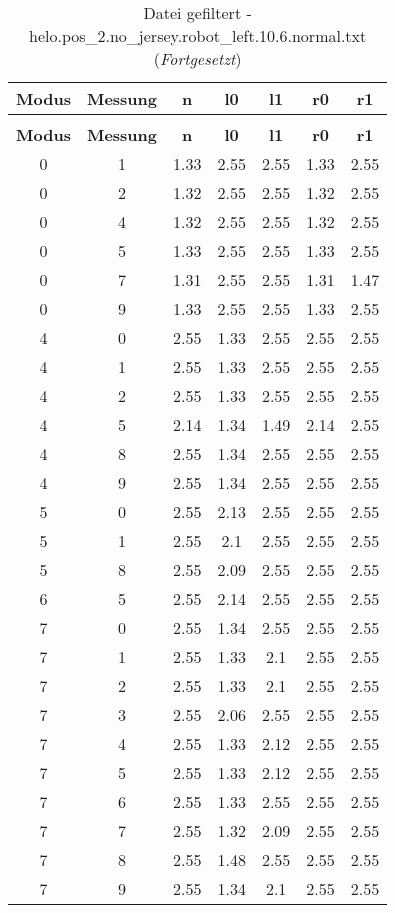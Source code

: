 \begin{longtable}{|c|c||c||c|c||c|c|}
	\caption{Datei gefiltert - helo.pos\_2.no\_jersey.robot\_left.10.6.normal.txt} \label{tab:helo.pos-2.no-jersey.robot-left.10.6.normal.txt} \\ \hline
	\textbf{Modus} & \textbf{Messung} & \textbf{n} & \textbf{l0} & \textbf{l1} & \textbf{r0} & \textbf{r1}\\ \hline
	\endfirsthead
	\caption[]{Datei gefiltert - helo.pos\_2.no\_jersey.robot\_left.10.6.normal.txt (\emph{Fortgesetzt})} \\ \hline
	\textbf{Modus} & \textbf{Messung} & \textbf{n} & \textbf{l0} & \textbf{l1} & \textbf{r0} & \textbf{r1}\\ \hline
	\endhead
	0 & 1 & 1.33 & 2.55 & 2.55 & 1.33 & 2.55 \\ \hline
	0 & 2 & 1.32 & 2.55 & 2.55 & 1.32 & 2.55 \\ \hline
	0 & 4 & 1.32 & 2.55 & 2.55 & 1.32 & 2.55 \\ \hline
	0 & 5 & 1.33 & 2.55 & 2.55 & 1.33 & 2.55 \\ \hline
	0 & 7 & 1.31 & 2.55 & 2.55 & 1.31 & 1.47 \\ \hline
	0 & 9 & 1.33 & 2.55 & 2.55 & 1.33 & 2.55 \\ \hline
	4 & 0 & 2.55 & 1.33 & 2.55 & 2.55 & 2.55 \\ \hline
	4 & 1 & 2.55 & 1.33 & 2.55 & 2.55 & 2.55 \\ \hline
	4 & 2 & 2.55 & 1.33 & 2.55 & 2.55 & 2.55 \\ \hline
	4 & 5 & 2.14 & 1.34 & 1.49 & 2.14 & 2.55 \\ \hline
	4 & 8 & 2.55 & 1.34 & 2.55 & 2.55 & 2.55 \\ \hline
	4 & 9 & 2.55 & 1.34 & 2.55 & 2.55 & 2.55 \\ \hline
	5 & 0 & 2.55 & 2.13 & 2.55 & 2.55 & 2.55 \\ \hline
	5 & 1 & 2.55 & 2.1 & 2.55 & 2.55 & 2.55 \\ \hline
	5 & 8 & 2.55 & 2.09 & 2.55 & 2.55 & 2.55 \\ \hline
	6 & 5 & 2.55 & 2.14 & 2.55 & 2.55 & 2.55 \\ \hline
	7 & 0 & 2.55 & 1.34 & 2.55 & 2.55 & 2.55 \\ \hline
	7 & 1 & 2.55 & 1.33 & 2.1 & 2.55 & 2.55 \\ \hline
	7 & 2 & 2.55 & 1.33 & 2.1 & 2.55 & 2.55 \\ \hline
	7 & 3 & 2.55 & 2.06 & 2.55 & 2.55 & 2.55 \\ \hline
	7 & 4 & 2.55 & 1.33 & 2.12 & 2.55 & 2.55 \\ \hline
	7 & 5 & 2.55 & 1.33 & 2.12 & 2.55 & 2.55 \\ \hline
	7 & 6 & 2.55 & 1.33 & 2.55 & 2.55 & 2.55 \\ \hline
	7 & 7 & 2.55 & 1.32 & 2.09 & 2.55 & 2.55 \\ \hline
	7 & 8 & 2.55 & 1.48 & 2.55 & 2.55 & 2.55 \\ \hline
	7 & 9 & 2.55 & 1.34 & 2.1 & 2.55 & 2.55 \\ \hline
\end{longtable}
